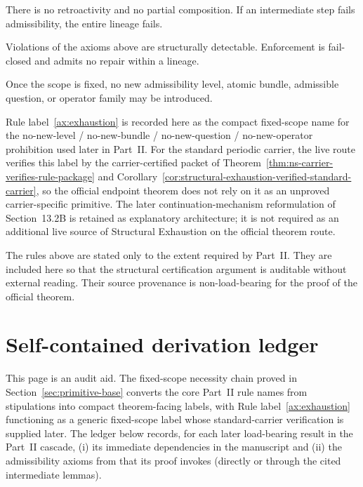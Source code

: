 \begin{axiom}\label{ax:composition}
There is no retroactivity and no partial composition. If an intermediate step fails admissibility,
the entire lineage fails.
\end{axiom}

\begin{axiom}\label{ax:enforcement}
Violations of the axioms above are structurally detectable. Enforcement is fail-closed and admits no
repair within a lineage.
\end{axiom}

\begin{rulelabel}\label{ax:exhaustion}
Once the scope is fixed, no new admissibility level, atomic bundle, admissible question, or operator
family may be introduced.
\end{rulelabel}

\begin{remark}
Rule label~\ref{ax:exhaustion} is recorded here as the compact fixed-scope name for the no-new-level /
no-new-bundle / no-new-question / no-new-operator prohibition used later in Part~II. For the standard
periodic carrier, the live route verifies this label by the carrier-certified packet of
Theorem~\ref{thm:ns-carrier-verifies-rule-package} and
Corollary~\ref{cor:structural-exhaustion-verified-standard-carrier}, so the official endpoint theorem does not
rely on it as an unproved carrier-specific primitive. The later continuation-mechanism reformulation of
Section~13.2B is retained as explanatory architecture; it is not required as an additional live source
of Structural Exhaustion on the official theorem route.
\end{remark}

\begin{remark}[Provenance]
The rules above are stated only to the extent required by Part~II. They are included here so that the structural certification argument is auditable without external reading. Their source provenance is non-load-bearing for the proof of the official theorem.
\end{remark}



\section{Self-contained derivation ledger}\label{sec:axiom-ledger}
This page is an audit aid. The fixed-scope necessity chain proved in Section~\ref{sec:primitive-base} converts the core Part~II rule names from stipulations into compact theorem-facing labels, with Rule label~\ref{ax:exhaustion} functioning as a generic fixed-scope label whose standard-carrier verification is supplied later. The ledger below records, for each later load-bearing result in the Part~II cascade, (i) its immediate dependencies in the manuscript and (ii) the admissibility axioms from
 that its proof invokes (directly or through the cited intermediate lemmas).

